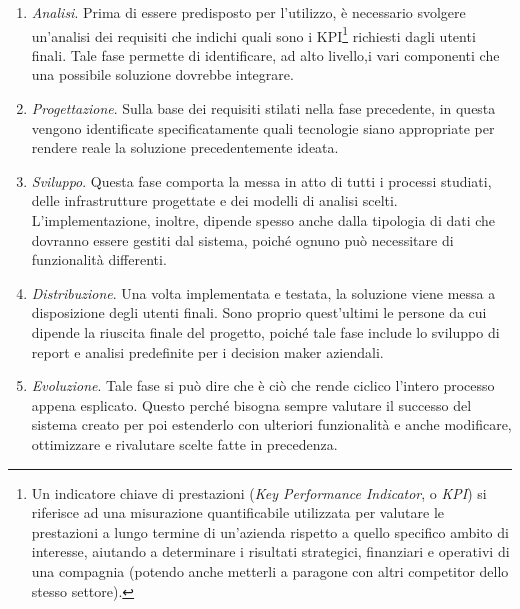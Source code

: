\begin{enumerate}
    \item \textit{Analisi}. Prima di essere predisposto per l'utilizzo, è necessario svolgere un'analisi dei requisiti che indichi quali sono i KPI\footnote{Un indicatore chiave di prestazioni (\textit{Key Performance Indicator}, o \textit{KPI}) si riferisce ad una misurazione quantificabile utilizzata per valutare le prestazioni a lungo termine di un'azienda rispetto a quello specifico ambito di interesse, aiutando a determinare i risultati strategici, finanziari e operativi di una compagnia (potendo anche metterli a paragone con altri competitor dello stesso settore).\cite{investopedia_kpi}} richiesti dagli utenti finali. Tale fase permette di identificare, ad alto livello,i vari componenti che una possibile soluzione dovrebbe integrare.
    \item \textit{Progettazione}. Sulla base dei requisiti stilati nella fase precedente, in questa vengono identificate specificatamente quali tecnologie siano appropriate per rendere reale la soluzione precedentemente ideata.
    \item \textit{Sviluppo}. Questa fase comporta la messa in atto di tutti i processi studiati, delle infrastrutture progettate e dei modelli di analisi scelti. L'implementazione, inoltre, dipende spesso anche dalla tipologia di dati che dovranno essere gestiti dal sistema, poiché ognuno può necessitare di funzionalità differenti.
    \item \textit{Distribuzione}. Una volta implementata e testata, la soluzione viene messa a disposizione degli utenti finali. Sono proprio quest'ultimi le persone da cui dipende la riuscita finale del progetto, poiché tale fase include lo sviluppo di report e analisi predefinite per i decision maker aziendali.
    \item \textit{Evoluzione}. Tale fase si può dire che è ciò che rende ciclico l'intero processo appena esplicato. Questo perché bisogna sempre valutare il successo del sistema creato per poi estenderlo con ulteriori funzionalità e anche modificare, ottimizzare e rivalutare scelte fatte in precedenza.
\end{enumerate}

